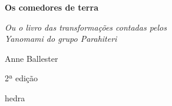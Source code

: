 




\begingroup\thispagestyle{empty}\vspace*{.05\textheight} 

              \formular
              \Huge
              \noindent
              \textbf{Os comedores de terra}
              
              \vspace{0.3em}

              \noindent\large\textit{Ou o livro das transformações contadas pelos\\ Yanomami do  grupo Parahiteri}

              \vspace{3em}
              
              \Large\noindent
              Anne Ballester
              
              \vspace{3em}
              
              \newfontfamily{}
              

              \bigskip

              \noindent
              {\selectfont\minion\small\noindent 2ª edição}

              \vfill

              \newfontfamily{}
              {\noindent\fontsize{30}{40}\selectfont \timesnewroman hedra}


\endgroup
\pagebreak
